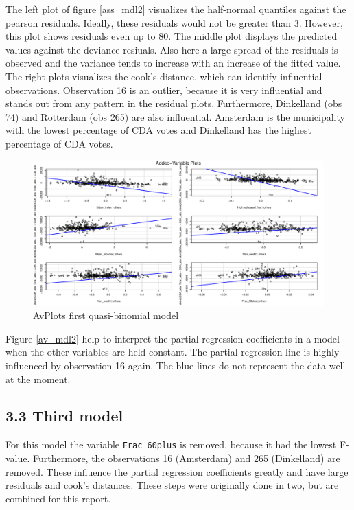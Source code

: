 \documentclass[11pt,]{article}
\begin{document}
The left plot of figure \ref{ass_mdl2} visualizes the half-normal
quantiles against the pearson residuals. Ideally, these residuals would
not be greater than 3. However, this plot shows residuals even up to 80.
The middle plot displays the predicted values against the deviance
resiuals. Also here a large spread of the residuals is observed and the
variance tends to increase with an increase of the fitted value. The
right plots visualizes the cook's distance, which can identify
influential observations. Observation 16 is an outlier, because it is
very influential and stands out from any pattern in the residual plots.
Furthermore, Dinkelland (obs 74) and Rotterdam (obs 265) are also
influential. Amsterdam is the municipality with the lowest percentage of
CDA votes and Dinkelland has the highest percentage of CDA votes.

\begin{figure}[H]

{\centering \includegraphics{Report_files/figure-latex/unnamed-chunk-17-1} 

}

\caption{\label{av_mdl2}AvPlots first quasi-binomial model}\label{fig:unnamed-chunk-17}
\end{figure}

Figure \ref{av_mdl2} help to interpret the partial regression
coefficients in a model when the other variables are held constant. The
partial regression line is highly influenced by observation 16 again.
The blue lines do not represent the data well at the moment.

\subsection{3.3 Third model}\label{third-model}

For this model the variable \texttt{Frac\_60plus} is removed, because it
had the lowest F-value. Furthermore, the observations 16 (Amsterdam) and
265 (Dinkelland) are removed. These influence the partial regression
coefficients greatly and have large residuals and cook's distances.
These steps were originally done in two, but are combined for this
report.
\end{document}
